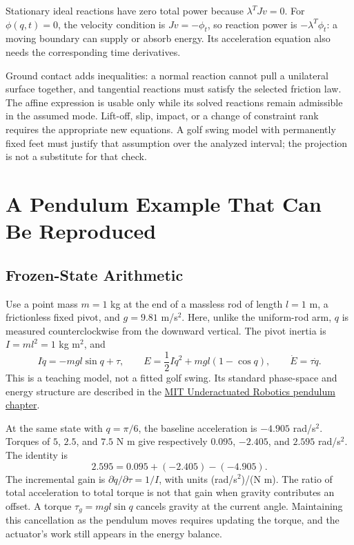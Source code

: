 Stationary ideal reactions have zero total power because $\lambda^TJv=0$. For $\phi(q,t)=0$, the velocity condition is $Jv=-\phi_t$, so reaction power is $-\lambda^T\phi_t$: a moving boundary can supply or absorb energy. Its acceleration equation also needs the corresponding time derivatives.

Ground contact adds inequalities: a normal reaction cannot pull a unilateral surface together, and tangential reactions must satisfy the selected friction law. The affine expression is usable only while its solved reactions remain admissible in the assumed mode. Lift-off, slip, impact, or a change of constraint rank requires the appropriate new equations. A golf swing model with permanently fixed feet must justify that assumption over the analyzed interval; the projection is not a substitute for that check.

\section{A Pendulum Example That Can Be Reproduced}

\subsection{Frozen-State Arithmetic}

Use a point mass $m=1$ kg at the end of a massless rod of length $l=1$ m, a frictionless fixed pivot, and $g=9.81$ m/s$^2$. Here, unlike the uniform-rod arm, $q$ is measured counterclockwise from the downward vertical. The pivot inertia is $I=ml^2=1$ kg m$^2$, and
\begin{equation}
I\ddot q=-mgl\sin q+\tau,\qquad
E=\frac12I\dot q^2+mgl(1-\cos q),\qquad \dot E=\tau\dot q.
\label{eq:ch3:pendulum-eom}
\end{equation}
This is a teaching model, not a fitted golf swing. Its standard phase-space and energy structure are described in the \href{https://underactuated.mit.edu/pend.html}{MIT Underactuated Robotics pendulum chapter}.

At the same state with $q=\pi/6$, the baseline acceleration is $-4.905$ rad/s$^2$. Torques of $5$, $2.5$, and $7.5$ N m give respectively $0.095$, $-2.405$, and $2.595$ rad/s$^2$. The identity is
\begin{equation}
2.595=0.095+(-2.405)-(-4.905).
\end{equation}
The incremental gain is $\partial\ddot q/\partial\tau=1/I$, with units (rad/s$^2$)/(N m). The ratio of total acceleration to total torque is not that gain when gravity contributes an offset. A torque $\tau_g=mgl\sin q$ cancels gravity at the current angle. Maintaining this cancellation as the pendulum moves requires updating the torque, and the actuator's work still appears in the energy balance.

